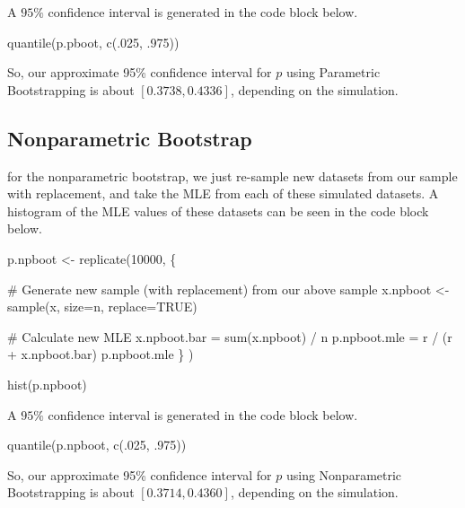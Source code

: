\documentclass[
  letterpaper,
  DIV=11,
  numbers=noendperiod]{scrreprt}
\newenvironment{Shaded}{\begin{snugshade}}{\end{snugshade}}
\newcommand{\NormalTok}[1]{\textcolor[rgb]{0.00,0.23,0.31}{#1}}
\begin{document}
A \(95\%\) confidence interval is generated in the code block below.

\begin{Shaded}
\begin{Highlighting}[]
\NormalTok{quantile(p.pboot, c(.025, .975))}
\end{Highlighting}
\end{Shaded}

So, our approximate 95\% confidence interval for \(p\) using Parametric
Bootstrapping is about \([0.3738, 0.4336]\), depending on the
simulation.

\subsection{Nonparametric Bootstrap}\label{nonparametric-bootstrap}

for the nonparametric bootstrap, we just re-sample new datasets from our
sample with replacement, and take the MLE from each of these simulated
datasets. A histogram of the MLE values of these datasets can be seen in
the code block below.

\begin{Shaded}
\begin{Highlighting}[]
\NormalTok{p.npboot \textless{}{-} replicate(10000, \{}
  
\NormalTok{    \# Generate new sample (with replacement) from our above sample}
\NormalTok{    x.npboot \textless{}{-} sample(x, size=n, replace=TRUE)}
    
\NormalTok{    \# Calculate new MLE}
\NormalTok{    x.npboot.bar = sum(x.npboot) / n}
\NormalTok{    p.npboot.mle = r / (r + x.npboot.bar)}
\NormalTok{    p.npboot.mle}
\NormalTok{  \}}
\NormalTok{)}

\NormalTok{hist(p.npboot)}
\end{Highlighting}
\end{Shaded}

A \(95\%\) confidence interval is generated in the code block below.

\begin{Shaded}
\begin{Highlighting}[]
\NormalTok{quantile(p.npboot, c(.025, .975))}
\end{Highlighting}
\end{Shaded}

So, our approximate 95\% confidence interval for \(p\) using
Nonparametric Bootstrapping is about \([0.3714, 0.4360]\), depending on
the simulation.
\end{document}
